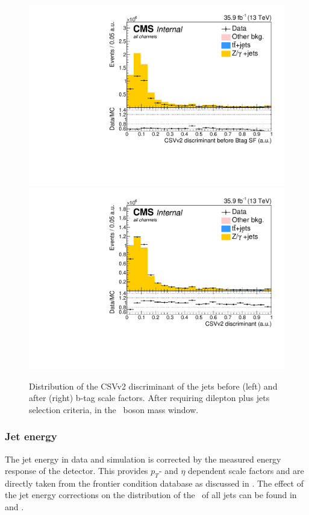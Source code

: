\begin{figure}[htbp]
	\centering
	\includegraphics[width=0.49\linewidth]{5_Eventselection/Figures/Reweighing/2lepcontrol_dilep_bdisc_bfBT_all_Stack}
	\includegraphics[width=0.49\linewidth]{5_Eventselection/Figures/Reweighing/2lepcontrol_dilep_bdisc_all_Stack}	
	\caption{Distribution of the CSVv2 discriminant of the jets before (left) and after (right) b-tag scale factors. After requiring dilepton plus jets selection criteria, in the \PZ\ boson mass window.}
	\label{fig:bSF}
\end{figure}

\subsubsection*{Jet energy}
\label{sec:jer}
The jet energy in data and simulation is corrected by the measured energy response of the detector. This provides $p_T$- and $\eta$ dependent scale factors and are directly taken from the frontier condition database as discussed in . 
The effect of the jet energy corrections on the distribution of the \pt\ of all jets can be found in  and .

